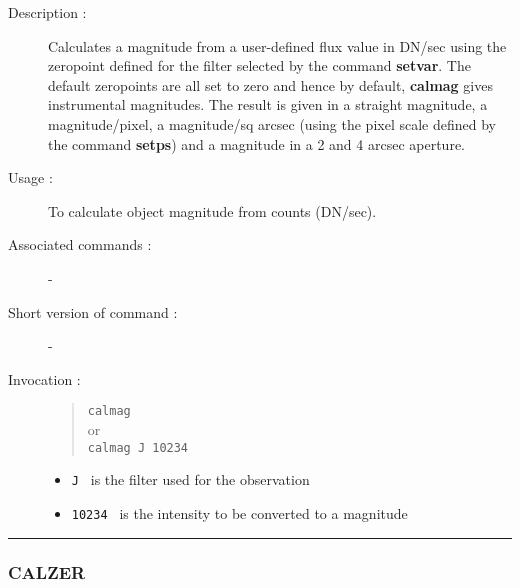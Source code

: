 \begin{description}

\item[Description :] Calculates a magnitude from a user-defined flux
value in DN/sec using the zeropoint defined for the filter selected by
the command {\bf setvar}. The default zeropoints are all set to zero
and hence by default, {\bf calmag} gives instrumental magnitudes.  The
result is given in a straight magnitude, a magnitude/pixel, a
magnitude/sq arcsec (using the pixel scale defined by the command {\bf
setps}) and a magnitude in a 2 and 4 arcsec aperture.

\item[Usage :] To calculate object magnitude from counts (DN/sec).
\item[Associated commands :] -
\item[Short version of command :] -
\item[Invocation :]

\begin{quote}{\tt  calmag }\\
or \\
{\tt calmag J 10234 }
\end{quote}

\begin{itemize}

\item {\tt J } is the filter used for the observation
\item {\tt 10234 } is the intensity to be converted to a magnitude

\end{itemize}

\end{description}

\hrule
\subsubsection*{\label{CALZER}CALZER}

